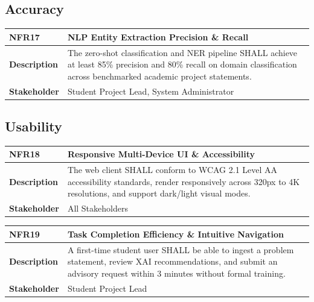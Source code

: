 \subsection{Accuracy}
\label{subsec:nfr_accuracy}

\begin{table}[H]
\centering
\small
\begin{tabularx}{\textwidth}{|l|X|}
\hline
\rowcolor{lightgray!40} \textbf{NFR17} & \textbf{NLP Entity Extraction Precision \& Recall} \\ \hline
\textbf{Description} & The zero-shot classification and NER pipeline SHALL achieve at least 85\% precision and 80\% recall on domain classification across benchmarked academic project statements. \\ \hline
\textbf{Stakeholder} & Student Project Lead, System Administrator \\ \hline
\end{tabularx}
\end{table}

\subsection{Usability}
\label{subsec:nfr_usability}

\begin{table}[H]
\centering
\small
\begin{tabularx}{\textwidth}{|l|X|}
\hline
\rowcolor{lightgray!40} \textbf{NFR18} & \textbf{Responsive Multi-Device UI \& Accessibility} \\ \hline
\textbf{Description} & The web client SHALL conform to WCAG 2.1 Level AA accessibility standards, render responsively across 320px to 4K resolutions, and support dark/light visual modes. \\ \hline
\textbf{Stakeholder} & All Stakeholders \\ \hline
\end{tabularx}
\end{table}

\begin{table}[H]
\centering
\small
\begin{tabularx}{\textwidth}{|l|X|}
\hline
\rowcolor{lightgray!40} \textbf{NFR19} & \textbf{Task Completion Efficiency \& Intuitive Navigation} \\ \hline
\textbf{Description} & A first-time student user SHALL be able to ingest a problem statement, review XAI recommendations, and submit an advisory request within 3 minutes without formal training. \\ \hline
\textbf{Stakeholder} & Student Project Lead \\ \hline
\end{tabularx}
\end{table}

